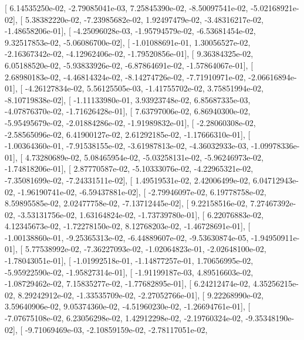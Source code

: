 \documentclass{article}
\begin{document}
       [  6.14535250e-02,  -2.79085041e-03,   7.25845390e-02,
         -8.50097541e-02,  -5.02168921e-02],
       [  5.38382220e-02,  -7.23985682e-02,   1.92497479e-02,
         -3.48316217e-02,  -1.48658206e-01],
       [ -4.25096028e-03,  -1.95794579e-02,  -6.53681454e-02,
          9.32517853e-02,  -5.06086700e-02],
       [ -1.01088691e-01,   1.30056527e-02,  -2.16367342e-02,
         -4.12962406e-02,  -1.79520856e-01],
       [  9.36384325e-02,   6.05188520e-02,  -5.93833926e-02,
         -6.87864691e-02,  -1.57864067e-01],
       [  2.68980183e-02,  -4.46814324e-02,  -8.14274726e-02,
         -7.71910971e-02,  -2.06616894e-01],
       [ -4.26127834e-02,   5.56125505e-03,  -1.41755702e-02,
          3.75851994e-02,  -8.10719838e-02],
       [ -1.11133980e-01,   3.93923748e-02,   6.85687335e-03,
         -4.07876370e-02,  -1.71626428e-01],
       [  7.63797006e-02,   6.86940300e-02,  -5.95495679e-02,
         -2.01884286e-02,  -1.91989832e-01],
       [ -2.28060308e-02,  -2.58565096e-02,   6.41900127e-02,
          2.61292185e-02,  -1.17666310e-01],
       [ -1.00364360e-01,  -7.91538155e-02,  -3.61987813e-02,
         -4.36032933e-03,  -1.09978336e-01],
       [  4.73280689e-02,   5.08465954e-02,  -5.03258131e-02,
         -5.96246973e-02,  -1.74818206e-01],
       [  2.87770587e-02,  -5.10333076e-02,  -4.22965321e-02,
         -7.35081699e-02,  -7.24331511e-02],
       [  1.49519531e-02,   2.42006499e-02,   6.04712943e-02,
         -1.96190741e-02,  -6.59437881e-02],
       [ -2.79946097e-02,   6.19778758e-02,   8.59895585e-02,
          2.02477758e-02,  -7.13712445e-02],
       [  9.22158516e-02,   7.27467392e-02,  -3.53131756e-02,
          1.63164824e-02,  -1.73739780e-01],
       [  6.22076883e-02,   4.12345673e-02,  -1.72278150e-02,
          8.12768203e-02,  -1.46728691e-01],
       [ -1.00138860e-01,  -9.25365313e-02,  -6.44889607e-02,
         -9.53630874e-05,  -1.94950911e-01],
       [  5.77538992e-02,  -7.36227093e-02,  -1.02064823e-01,
         -2.02648100e-02,  -1.78043051e-01],
       [ -1.01992518e-01,  -1.14877257e-01,   1.70656995e-02,
         -5.95922590e-02,  -1.95827314e-01],
       [ -1.91199187e-03,   4.89516603e-02,  -1.08729462e-02,
          7.15835277e-02,  -1.77682895e-01],
       [  6.24212474e-02,   4.35256215e-02,   8.29242912e-02,
         -1.33535709e-02,  -2.27052766e-01],
       [  9.22268990e-02,   3.59640906e-02,   9.05374360e-02,
         -4.51960230e-02,  -1.26694761e-01],
       [ -7.07675108e-02,   6.23056298e-02,   1.42912298e-02,
         -2.19760324e-02,  -9.35348190e-02],
       [ -9.71069469e-03,  -2.10859159e-02,  -2.78117051e-02,
\end{document}
